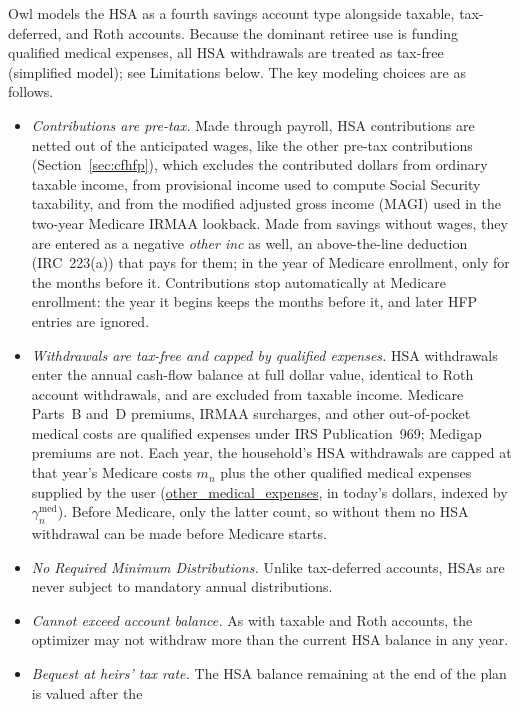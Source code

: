 \documentclass[fleqn,12pt]{report}
\newcommand{\code}[1]{\url{#1}}
\begin{document}
Owl models the HSA as a fourth savings account type alongside taxable,
tax-deferred, and Roth accounts.
Because the dominant retiree use is funding qualified medical expenses, all
HSA withdrawals are treated as tax-free (simplified model); see Limitations below.
The key modeling choices are as follows.
\begin{itemize}[nosep]
  \item \textit{Contributions are pre-tax.}
    Made through payroll, HSA contributions are netted out of the anticipated
    wages, like the other pre-tax contributions (Section~\ref{sec:cfhfp}), which
    excludes the contributed dollars from ordinary taxable income, from
    provisional income used to compute Social Security taxability, and from the
    modified adjusted gross income (MAGI) used in the two-year Medicare IRMAA
    lookback. Made from savings without wages, they are entered as a negative
    \textit{other inc} as well, an above-the-line deduction (IRC~223(a)) that
    pays for them; in the year of Medicare enrollment, only for the months
    before it.
    Contributions stop automatically at Medicare enrollment: the year it begins keeps the
    months before it, and later HFP entries are ignored.
  \item \textit{Withdrawals are tax-free and capped by qualified expenses.}
    HSA withdrawals enter the annual cash-flow balance at full dollar value,
    identical to Roth account withdrawals, and are excluded from taxable income.
    Medicare Parts~B and~D premiums, IRMAA surcharges, and other out-of-pocket
    medical costs are qualified expenses under IRS Publication~969; Medigap
    premiums are not.
    Each year, the household's HSA withdrawals are capped at that year's Medicare
    costs $m_n$ plus the other qualified medical expenses supplied by the user
    (\code{other_medical_expenses}, in today's dollars, indexed by $\gamma^{\mathrm{med}}_n$).
    Before Medicare, only the latter count, so without them no HSA withdrawal can
    be made before Medicare starts.
  \item \textit{No Required Minimum Distributions.}
    Unlike tax-deferred accounts, HSAs are never subject to mandatory annual
    distributions.
  \item \textit{Cannot exceed account balance.}
    As with taxable and Roth accounts, the optimizer may not withdraw more
    than the current HSA balance in any year.
  \item \textit{Bequest at heirs' tax rate.}
    The HSA balance remaining at the end of the plan is valued after the

\end{itemize}
\end{document}
